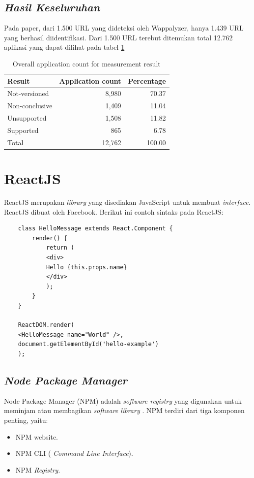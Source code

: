 \subsection{\textit{Hasil Keseluruhan}}
Pada paper\cite{pascal}, dari 1.500 URL yang dideteksi oleh Wappalyzer, hanya 1.439 URL yang berhasil diidentifikasi. Dari 1.500 URL terebut ditemukan total 12.762 aplikasi yang dapat dilihat pada tabel \ref{table:apr}
\begin{table}[h!]
	\centering
	\begin{tabular}{lrr} 
		\hline
		\textbf{Result} & \textbf{Application count} & \textbf{Percentage}\\
		\hline
		Not-versioned & 8,980 & 70.37\\
		Non-conclusive & 1,409 & 11.04\\
		Unsupported & 1,508 & 11.82\\
		Supported & 865 & 6.78\\
		\hline
		Total & 12,762 & 100.00\\
		\hline
		
	\end{tabular}
	\caption{Overall application count for measurement result}
	\label{table:apr}
\end{table}

\section{ReactJS}
ReactJS merupakan \textit{library} yang disediakan JavaScript untuk membuat \textit{interface}. ReactJS dibuat oleh Facebook. Berikut ini contoh sintaks pada ReactJS:
\begin{lstlisting}
	class HelloMessage extends React.Component {
		render() {
			return (
			<div>
			Hello {this.props.name}
			</div>
			);
		}
	}
	
	ReactDOM.render(
	<HelloMessage name="World" />,
	document.getElementById('hello-example')
	);
\end{lstlisting}

\subsection{\textit{Node Package Manager}}
Node Package Manager (NPM) adalah \textit{software registry} yang digunakan untuk meminjam atau membagikan \textit{software library} \cite{npmAbout}. NPM terdiri dari tiga komponen penting, yaitu:
\begin{itemize}
	\item NPM website.
	\item NPM CLI ( \textit{Command Line Interface}). 
	\item NPM \textit{Registry}.
\end{itemize}


